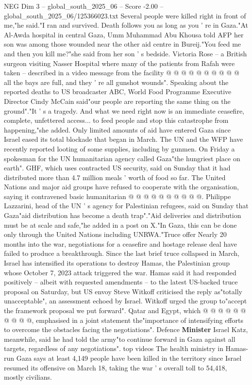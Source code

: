 \begin{textsample}{NEG Dim 3 – global\_south\_2025\_06 – Score -2.00 – global\_south\_2025\_06/125366023.txt}
Several people were killed right in front of me,"he said."I ran and survived.
Death follows you as long as you ' re in Gaza."At Al-Awda hospital in central Gaza, Umm Muhammad Abu Khousa told AFP her son was among those wounded near the other aid centre in Bureij."You feed me and then you kill me?"she said from her son ' s bedside.
Victoria Rose -- a British surgeon visiting Nasser Hospital where many of the patients from Rafah were taken -- described in a video message from the facility @ @ @ @ @ @ @ @ @ @ all the bays are full, and they ' re all gunshot wounds".
Speaking about the reported deaths to US broadcaster ABC, World Food Programme Executive Director Cindy McCain said"our people are reporting the same thing on the ground"."It ' s a tragedy.
And what we need right now is an immediate ceasefire, complete, unfettered access... to feed people and stop this catastrophe from happening,"she added.
Only limited amounts of aid have entered Gaza since Israel eased its total blockade that began in March.
The UN and the WFP have recently reported looting of some supplies, including by gunmen.
On Friday a spokesman for the UN humanitarian agency called Gaza"the hungriest place on earth".
GHF, which uses contracted US security, said on Sunday that it had distributed more than 4.7 million meals ' worth of food so far.
The United Nations and major aid groups have refused to cooperate with the organisation, saying it contravened basic humanitarian @ @ @ @ @ @ @ @ @ @.
Philippe Lazzarini, head of the UN ' s agency for Palestinian refugees, said on Sunday that Gaza"aid distribution has become a death trap"."Aid deliveries and distribution must be at scale and safe,"he added in a post on X."In Gaza, this can be done only through the United Nations including UNRWA."Truce offer Nearly 20 months into the war, negotiations for a ceasefire and hostage release deal have failed to produce a breakthrough.
Since the last brief truce collapsed in March, Israel has intensified its operations to destroy Hamas, the Palestinian group whose October 7, 2023 attack triggered the war.
Hamas said it had responded positively -- albeit with requested amendments -- to the latest US-backed truce proposal on Saturday, but US envoy Steve Witkoff criticised the reply as"totally unacceptable", an assessment echoed by Israel.
Witkoff urged the group to"accept the framework proposal we put forward".
Qatar and Egypt, which @ @ @ @ @ @ @ @ @ @, emphasised in a joint statement the"importance of intensifying efforts to overcome the obstacles facing the negotiations".
Defence \textbf{Minister} Israel Katz, meanwhile, said he had told the army"to continue forward in Gaza against all targets, regardless of any negotiations". top videos The health ministry in Hamas-run Gaza says at least 4,149 people have been killed in the territory since Israel resumed its offensive on March 18, taking the war ' s overall toll to 54,418, mostly civilians.

\end{textsample}
